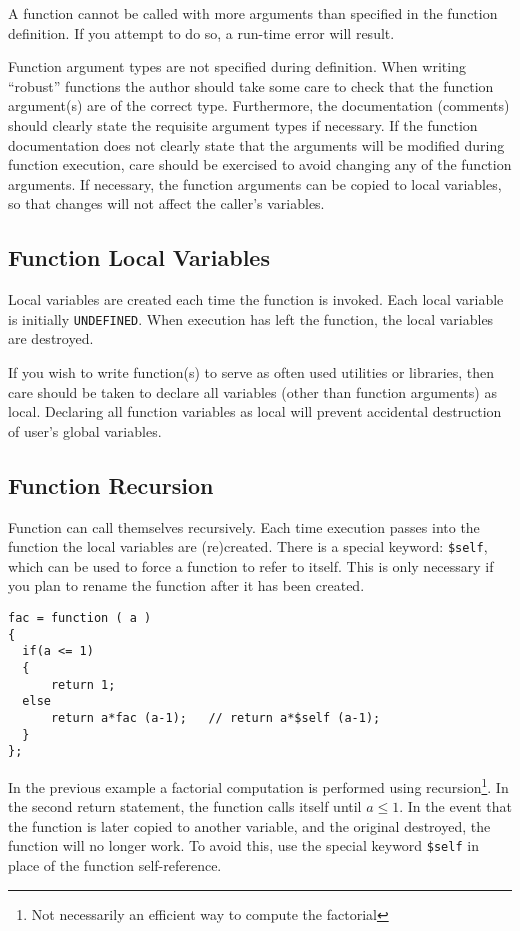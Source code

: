    A function cannot be called with more arguments than specified in
   the function definition. If you attempt to do so, a run-time error
   will result.

   Function argument types are not specified during definition. When
   writing ``robust'' functions the author should take some care to
   check that the function argument(s) are of the correct type.
   Furthermore, the documentation (comments) should clearly state the
   requisite argument types if necessary. If the function
   documentation does not clearly state that the arguments will be
   modified during function execution, care should be exercised to
   avoid changing any of the function arguments. If necessary, the
   function arguments can be copied to local variables, so that
   changes will not affect the caller's variables.

\subsection{Function Local Variables}

   Local variables are created each time the function is invoked. Each
   local variable is initially \verb+UNDEFINED+. When execution has
   left the function, the local variables are destroyed.

   If you wish to write function(s) to serve as often used utilities
   or libraries, then care should be taken to declare all variables
   (other than function arguments) as local. Declaring all function
   variables as local will prevent accidental destruction of user's
   global variables.

\subsection{Function Recursion}

   Function can call themselves recursively. Each time execution
   passes into the function the local variables are (re)created. There
   is a special keyword: \verb+$self+, which can be used to force a
   function to refer to itself. This is only necessary if you plan to
   rename the function after it has been created.

\begin{verbatim}
fac = function ( a ) 
{
  if(a <= 1) 
  {
      return 1;
  else
      return a*fac (a-1);   // return a*$self (a-1);
  }
};
\end{verbatim}

   In the previous example a factorial computation is performed using
   recursion\footnote{Not necessarily an efficient way to compute the
   factorial}. In the second return statement, the function calls
   itself until $a \leq 1$. In the event that the function is later
   copied to another variable, and the original destroyed, the
   function will no longer work. To avoid this, use the special
   keyword \verb+$self+ in place of the function self-reference.

